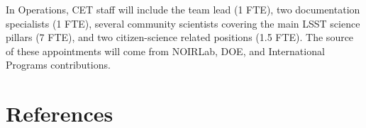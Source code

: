 \documentclass[DM,lsstdraft,toc]{lsstdoc}
\begin{document}
In Operations, CET staff will include the team lead (1 FTE), two documentation specialists (1 FTE), several community scientists covering the main LSST science pillars (7 FTE), and two citizen-science related positions (1.5 FTE). 
The source of these appointments will come from NOIRLab, DOE, and International Programs contributions.



\appendix
\section{References} \label{sec:bib}
\renewcommand{\refname}{} %


%
\end{document}
